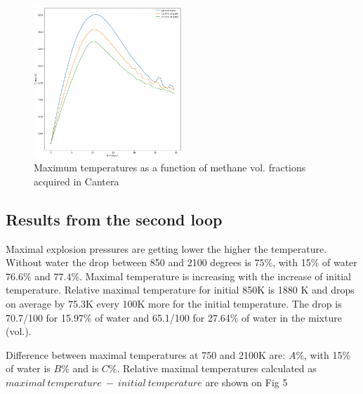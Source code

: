 \documentclass[a4paper]{article}
\begin{document}
\begin{figure}[h!]
\centering
\includegraphics[width=0.5\textwidth]{1_Tmax_to_CH4.png}
\caption{\label{fig:1_2}Maximum temperatures as a function of methane vol. fractions acquired in Cantera}
\end{figure}

\subsection{Results from the second loop}
Maximal explosion pressures are getting lower the higher the temperature. Without water the drop between 850 and 2100 degrees is $75\%$, with 15\% of water $76.6\%$ and $77.4\%$.
Maximal temperature is increasing with the increase of initial temperature. Relative maximal temperature for initial 850K is 1880 K and drops on average by 75.3K every 100K more for the initial temperature. The drop is 70.7/100 for 15.97\% of water and 65.1/100 for 27.64\% of water in the mixture (vol.).

Difference between maximal temperatures at 750 and 2100K are:  $A\%$, with 15\% of water is $B\%$ and is $C\%$.
Relative maximal temperatures calculated as $maximal\ temperature\ -\ initial\ temperature$ are shown on Fig 5
\end{document}
